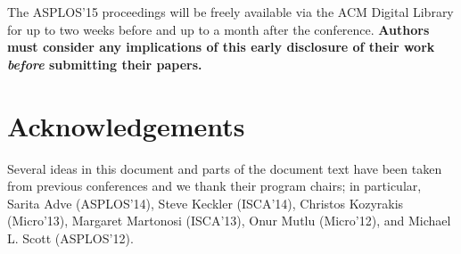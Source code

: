 \documentclass[pageno]{jpaper}
\begin{document}
The ASPLOS'15 proceedings will be freely available via the ACM Digital
Library for up to two weeks before and up to a month after the
conference. {\bf Authors must consider any implications of this early
disclosure of their work {\em before} submitting their papers.}


\section{Acknowledgements}
Several ideas in this document and parts of the document text have been
taken from previous conferences and we thank their program chairs;
in particular, Sarita Adve (ASPLOS'14), Steve Keckler (ISCA'14), 
Christos Kozyrakis (Micro'13), Margaret Martonosi (ISCA'13),
Onur Mutlu (Micro'12), and Michael L. Scott (ASPLOS'12).



\end{document}
